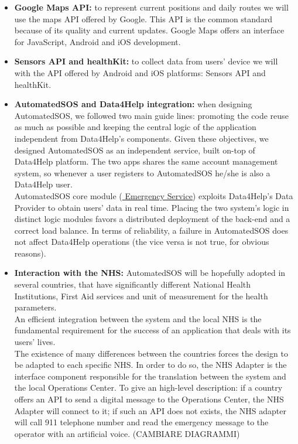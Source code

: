 \begin{itemize}
    \item \textbf{Google Maps API:} to represent current positions and daily routes we will use the maps API offered by Google. This API is the common standard because of its quality and current updates. Google Maps offers an interface for JavaScript, Android and iOS development.
    \item \textbf{Sensors API and healthKit:} to collect data from users' device we will with the API offered by Android and iOS platforms: Sensors API and healthKit.
    \item \textbf{AutomatedSOS and Data4Help integration:} when designing AutomatedSOS, we followed two main guide lines: promoting the code reuse as much as possible and keeping the central logic of the application independent from Data4Help's components.
    Given these objectives, we designed AutomatedSOS as an independent service, built on-top of Data4Help platform. 
    The two apps shares the same account management system, so whenever a user registers to AutomatedSOS he/she is also a Data4Help user.\\
    AutomatedSOS core module (\hyperlink{ES}{ \underline{Emergency Service}}) exploits Data4Help's Data Provider to obtain users' data in real time.
    Placing the two system's logic in distinct logic modules favors a distributed deployment of the back-end and a correct load balance.
    In terms of reliability, a failure in AutomatedSOS does not affect Data4Help operations (the vice versa is not true, for obvious reasons).
    \item \textbf{Interaction with the NHS:} AutomatedSOS will be hopefully adopted in several countries, that have significantly different National Health Institutions, First Aid services and unit of measurement for the health parameters.\\
    An efficient integration between the system and the local NHS is the fundamental requirement for the success of an application that deals with its users' lives.\\
    The existence of many differences between the countries forces the design to be adapted to each specific NHS. In order to do so, the NHS Adapter is the interface component responsible for the translation between the system and the local Operations Center.
    To give an high-level description: if a country offers an API to send a digital message to the Operations Center, the NHS Adapter will connect to it; if such an API does not exists, the NHS adapter will call 911 telephone number and read the emergency message to the operator with an artificial voice.
    (CAMBIARE DIAGRAMMI)
\end{itemize}